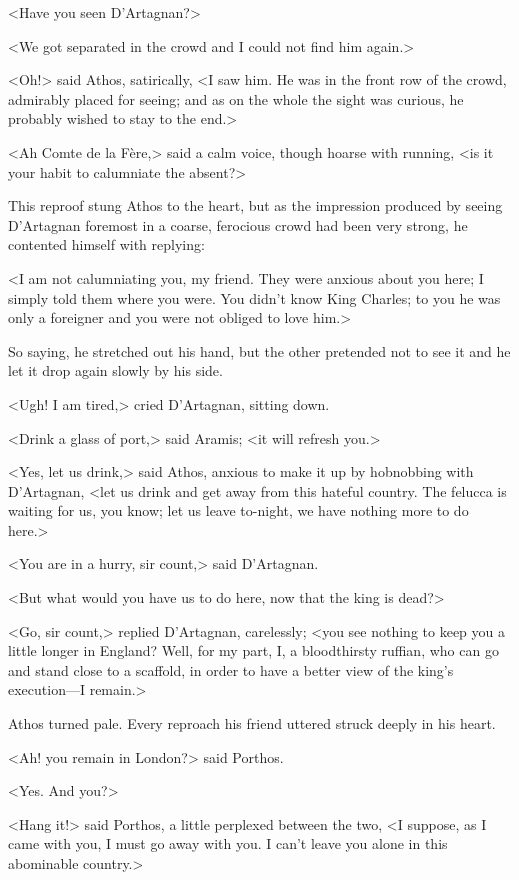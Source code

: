 <Have you seen D'Artagnan?>

<We got separated in the crowd and I could not find him again.>

<Oh!> said Athos, satirically, <I saw him. He was in the front row of the crowd, admirably placed for seeing; and as on the whole the sight was curious, he probably wished to stay to the end.>

<Ah Comte de la Fère,> said a calm voice, though hoarse with running, <is it your habit to calumniate the absent?>

This reproof stung Athos to the heart, but as the impression produced by seeing D'Artagnan foremost in a coarse, ferocious crowd had been very strong, he contented himself with replying:

<I am not calumniating you, my friend. They were anxious about you here; I simply told them where you were. You didn't know King Charles; to you he was only a foreigner and you were not obliged to love him.>

So saying, he stretched out his hand, but the other pretended not to see it and he let it drop again slowly by his side.

<Ugh! I am tired,> cried D'Artagnan, sitting down.

<Drink a glass of port,> said Aramis; <it will refresh you.>

<Yes, let us drink,> said Athos, anxious to make it up by hobnobbing with D'Artagnan, <let us drink and get away from this hateful country. The felucca is waiting for us, you know; let us leave to-night, we have nothing more to do here.>

<You are in a hurry, sir count,> said D'Artagnan.

<But what would you have us to do here, now that the king is dead?>

<Go, sir count,> replied D'Artagnan, carelessly; <you see nothing to keep you a little longer in England? Well, for my part, I, a bloodthirsty ruffian, who can go and stand close to a scaffold, in order to have a better view of the king's execution—I remain.>

Athos turned pale. Every reproach his friend uttered struck deeply in his heart.

<Ah! you remain in London?> said Porthos.

<Yes. And you?>

<Hang it!> said Porthos, a little perplexed between the two, <I suppose, as I came with you, I must go away with you. I can't leave you alone in this abominable country.>

